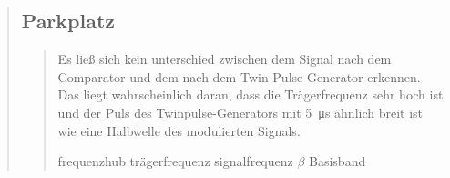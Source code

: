 \begin{quote}
\begin{quote}
\begin{quote}
                
        \end{quote}
            
        \subsubsection{}
            
            
    \end{quote}
    
    
    
    
    \subsection{Parkplatz}
    \begin{quote}
        
        Es ließ sich kein unterschied zwischen dem Signal nach dem Comparator und dem nach dem Twin Pulse Generator erkennen. Das
        liegt wahrscheinlich daran, dass die Trägerfrequenz sehr hoch ist und der Puls des Twinpulse-Generators mit
        \SI{5}{\micro\second} ähnlich breit ist wie eine Halbwelle des modulierten Signals.
        
        frequenzhub
        trägerfrequenz
        signalfrequenz
        $\beta$
        Basisband
        
    \end{quote}
    
\end{quote}



%     
%         

% 
% 
% 



